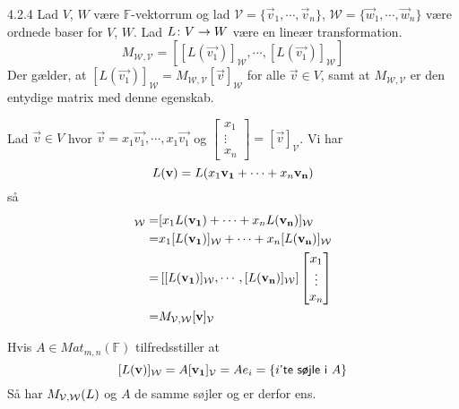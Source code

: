 %
% 

\begin{saetning}{4.2.4}
	Lad $V$, $W$ være $\mathbb{F}$-vektorrum og lad $\mathcal{V}=\{\vec{v}_1,
	\cdots,\vec{v}_n\}$, $\mathcal{W}=\{\vec{w}_1,\cdots,\vec{w}_n\}$ være
	ordnede baser for $V$, $W$. Lad $L \colon V \rightarrow W$ være en lineær transformation.
	\[
		M_{\mathcal{W},\mathcal{V}} = [[L(\vec{v_1})]_\mathcal{W}, \cdots,
		[L(\vec{v_1})]_\mathcal{W}]
	\]
	Der gælder, at $[L(\vec{v_1})]_\mathcal{W} = M_{\mathcal{W},\mathcal{V}}
	[\vec{v}]_\mathcal{W}$ for alle $\vec{v} \in V$, samt at
	$M_{\mathcal{W},\mathcal{V}}$ er den entydige matrix med denne egenskab.
\end{saetning}

\begin{bevis}
	Lad $\vec{v} \in V$ hvor $\vec{v} = x_1 \vec{v_1}, \cdots, x_1 \vec{v_1}$
	og $\begin{bmatrix} x_1 \\ \vdots \\ x_n \end{bmatrix} =
	[\vec{v}]_\mathcal{V}$. Vi har
	\[
		L(\mathbf{v}) = L(x_1 \mathbf{v_1} + \cdots + x_n \mathbf{v_n})
	\]
	så
	\begin{align*}
		[L(\vv)]_\sW =& [x_1 L(\vec{v_1}) + \cdots + x_n L(\vec{v_n})]_\sW \\
			=& x_1 [L(\vec{v_1})]_\sW + \cdots + x_n [L(\vec{v_n})]_\sW \\
			=& \left[ [L(\vec{v_1})]_\sW, \cdots, [L(\vec{v_n})]_\sW
				\right] \begin{bmatrix}
					x_1 \\
					\vdots \\
					x_n
				\end{bmatrix} \\
			=& M_{\sV,\sW} [\vv]_\sV
	\end{align*}

	Hvis $A \in Mat_{m,n}(\mathbb{F})$ tilfredsstiller at
	\[
		[L(\mathbf{v})]_{\mathcal{W}} = A[\mathbf{v_1}]_{\mathcal{V}} = Ae_i = \{i \textsf{'te søjle i } A\}
	\]
	Så har $M_{\mathcal{V},\mathcal{W}}(L)$ og $A$ de samme søjler og er derfor ens.
\end{bevis}
